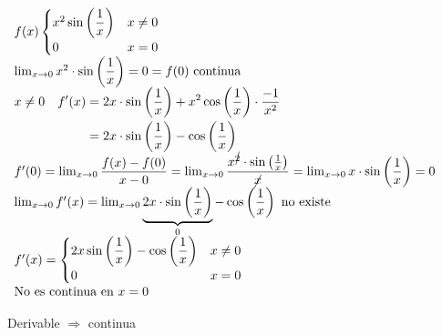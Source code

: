 \documentclass[12pt]{article}
\begin{document}
$\begin{array}{l}
	f(x)\begin{cases}
	x^2\sin\left(\dfrac{1}{x}\right) & x\neq0\\
	0 & x=0
\end{cases}\\
\lim_{x\to0}x^2\cdot\sin\left(\dfrac{1}{x}\right)=0=f(0)\text{ continua}\\
\begin{aligned}
	x\neq0\quad f'(x)&=2x\cdot\sin\left(\dfrac{1}{x}\right)+x^2\cos\left(\dfrac{1}{x}\right)\cdot\dfrac{-1}{x^2}\\
	& =2x\cdot\sin\left(\dfrac{1}{x}\right)-\cos\left(\dfrac{1}{x}\right)
\end{aligned}\\
f'(0)=\lim_{x\to0}\dfrac{f(x)-f(0)}{x-0}=\lim_{x\to0}\dfrac{x^{\cancel{2}}\cdot\sin\left(\frac{1}{x}\right)}{\cancel{x}}=\lim_{x\to0}x\cdot\sin\left(\dfrac{1}{x}\right)=0\\
\lim_{x\to0}f'(x)=\lim_{x\to0}\underbrace{2x\cdot\sin\left(\dfrac{1}{x}\right)}_0-\cos\left(\dfrac{1}{x}\right)\text{ no existe}\\
f'(x)=\begin{cases}
	2x\sin\left(\dfrac{1}{x}\right)-\cos\left(\dfrac{1}{x}\right) & x\neq0\\
	0 & x=0
\end{cases}\\
\text{No es continua en $x=0$}
\end{array}$

\begin{center}
	Derivable $\Longrightarrow$ continua
\end{center}
\end{document}
